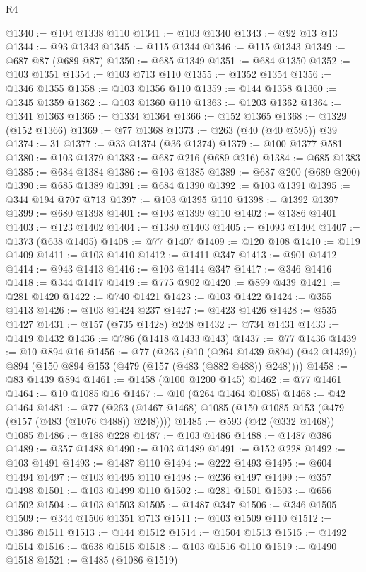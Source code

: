 \begin{lexlean}{R4}
\begin{coremodule}
@1340 := @104 @1338 @110
@1341 := @103 @1340
@1343 := @92 @13 @13
@1344 := @93 @1343
@1345 := @115 @1344
@1346 := @115 @1343
@1349 := @687 @87 (@689 @87)
@1350 := @685 @1349
@1351 := @684 @1350
@1352 := @103 @1351
@1354 := @103 @713 @110
@1355 := @1352 @1354
@1356 := @1346 @1355
@1358 := @103 @1356 @110
@1359 := @144 @1358
@1360 := @1345 @1359
@1362 := @103 @1360 @110
@1363 := @1203 @1362
@1364 := @1341 @1363
@1365 := @1334 @1364
@1366 := @152 @1365
@1368 := @1329 (@152 @1366)
@1369 := @77 @1368
@1373 := @263 (@40 (@40 @595)) @39
@1374 := 31
@1377 := @33 @1374 (@36 @1374)
@1379 := @100 @1377 @581
@1380 := @103 @1379
@1383 := @687 @216 (@689 @216)
@1384 := @685 @1383
@1385 := @684 @1384
@1386 := @103 @1385
@1389 := @687 @200 (@689 @200)
@1390 := @685 @1389
@1391 := @684 @1390
@1392 := @103 @1391
@1395 := @344 @194 @707 @713
@1397 := @103 @1395 @110
@1398 := @1392 @1397
@1399 := @680 @1398
@1401 := @103 @1399 @110
@1402 := @1386 @1401
@1403 := @123 @1402
@1404 := @1380 @1403
@1405 := @1093 @1404
@1407 := @1373 (@638 @1405)
@1408 := @77 @1407
@1409 := @120 @108
@1410 := @119 @1409
@1411 := @103 @1410
@1412 := @1411 @347
@1413 := @901 @1412
@1414 := @943 @1413
@1416 := @103 @1414 @347
@1417 := @346 @1416
@1418 := @344 @1417
@1419 := @775 @902
@1420 := @899 @439
@1421 := @281 @1420
@1422 := @740 @1421
@1423 := @103 @1422
@1424 := @355 @1413
@1426 := @103 @1424 @237
@1427 := @1423 @1426
@1428 := @535 @1427
@1431 := @157 (@735 @1428) @248
@1432 := @734 @1431
@1433 := @1419 @1432
@1436 := @786 (@1418 @1433 @143)
@1437 := @77 @1436
@1439 := @10 @894 @16
@1456 := @77
    (@263
      (@10 (@264 @1439 @894) (@42 @1439))
      @894
      (@150 @894 @153 (@479 (@157 (@483 (@882 @488)) @248))))
@1458 := @83 @1439 @894
@1461 := @1458 (@100 @1200 @145)
@1462 := @77 @1461
@1464 := @10 @1085 @16
@1467 := @10 (@264 @1464 @1085)
@1468 := @42 @1464
@1481 := @77 (@263 (@1467 @1468) @1085 (@150 @1085 @153 (@479 (@157 (@483 (@1076 @488)) @248))))
@1485 := @593 (@42 (@332 @1468)) @1085
@1486 := @188 @228
@1487 := @103 @1486
@1488 := @1487 @386
@1489 := @357 @1488
@1490 := @103 @1489
@1491 := @152 @228
@1492 := @103 @1491
@1493 := @1487 @110
@1494 := @222 @1493
@1495 := @604 @1494
@1497 := @103 @1495 @110
@1498 := @236 @1497
@1499 := @357 @1498
@1501 := @103 @1499 @110
@1502 := @281 @1501
@1503 := @656 @1502
@1504 := @103 @1503
@1505 := @1487 @347
@1506 := @346 @1505
@1509 := @344 @1506 @1351 @713
@1511 := @103 @1509 @110
@1512 := @1386 @1511
@1513 := @144 @1512
@1514 := @1504 @1513
@1515 := @1492 @1514
@1516 := @638 @1515
@1518 := @103 @1516 @110
@1519 := @1490 @1518
@1521 := @1485 (@1086 @1519)

\end{coremodule}
\end{lexlean}
